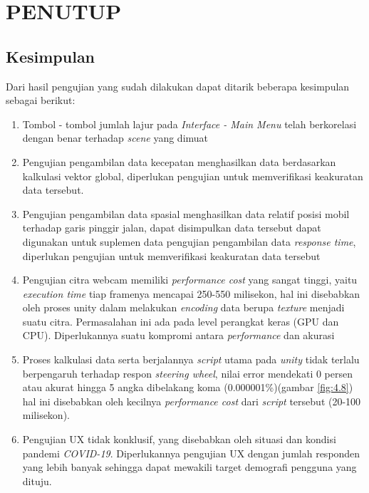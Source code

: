 \chapter{PENUTUP}
\vspace{1ex}

\section{Kesimpulan}
\vspace{1ex}

Dari hasil pengujian yang sudah dilakukan dapat ditarik beberapa kesimpulan sebagai berikut:
\vspace{1ex}

\begin{enumerate}[nolistsep]

\item Tombol - tombol jumlah lajur pada \textit{Interface - Main Menu} telah berkorelasi dengan benar terhadap \textit{scene} yang dimuat
\item Pengujian pengambilan data kecepatan menghasilkan data berdasarkan kalkulasi vektor global, diperlukan pengujian untuk memverifikasi keakuratan data tersebut.
\item Pengujian pengambilan data spasial menghasilkan data relatif posisi mobil terhadap garis pinggir jalan, dapat disimpulkan data tersebut dapat digunakan untuk suplemen data pengujian pengambilan data \textit{response time}, diperlukan pengujian untuk memverifikasi keakuratan data tersebut 
\item Pengujian citra webcam memiliki \textit{performance cost} yang sangat tinggi, yaitu \textit{execution time} tiap framenya mencapai 250-550 milisekon, hal ini disebabkan oleh proses unity dalam melakukan \textit{encoding} data berupa \textit{texture} menjadi suatu citra. Permasalahan ini ada pada level perangkat keras (GPU dan CPU). Diperlukannya suatu kompromi antara \textit{performance} dan akurasi
\item Proses kalkulasi data serta berjalannya \textit{script} utama pada \textit{unity} tidak terlalu berpengaruh terhadap respon \textit{steering wheel}, nilai error mendekati 0 persen atau akurat hingga 5 angka dibelakang koma (0.000001\%)(gambar \ref{fig:4.8}) hal ini disebabkan oleh kecilnya \textit{performance cost} dari \textit{script} tersebut (20-100 milisekon).
\item Pengujian UX tidak konklusif, yang disebabkan oleh situasi dan kondisi pandemi \textit{COVID-19}. Diperlukannya pengujian UX dengan jumlah responden yang lebih banyak sehingga dapat mewakili target demografi pengguna yang dituju.

\end{enumerate}
\vspace{1ex}

